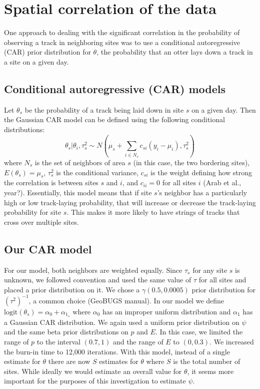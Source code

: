 \documentclass[12pt]{article}
\begin{document}
\section{Spatial correlation of the data}
One approach to dealing with the significant correlation in the probability of
observing a track in neighboring sites was to use a conditional autoregressive
(CAR) prior distribution for $\theta$, the probability that an otter lays down a
track in a site on a given day.

    \subsection{Conditional autoregressive (CAR) models}
    Let $\theta_s$ be the probability of a track being laid down in site $s$ on
    a given day. Then the Gaussian CAR model can be defined using the following
    conditional distributions:
    \begin{equation}
        \theta_s|\theta_i,\tau_s^2 \sim N(\mu_s+\sum_{i\in N_s}
        c_{si}(y_i-\mu_i),\tau_s^2)
    \end{equation}
    where $N_s$ is the set of neighbors of area $s$ (in this case, the two
    bordering sites), $E(\theta_s)=\mu_s$, $\tau_s^2$ is the conditional
    variance, $c_{si}$ is the weight defining how strong the correlation is
    between sites $s$ and $i$, and $c_{ii}=0$ for all sites $i$ (Arab et al.,
    year?). Essentially, this model means that if site $s$'s neighbor has a
    particularly high or low track-laying probability, that will increase or
    decrease the track-laying probability for site $s$. This makes it more
    likely to have strings of tracks that cross over multiple sites.

    \subsection{Our CAR model}
    \label{car model}
    For our model, both neighbors are weighted equally. Since $\tau_s$ for any
    site $s$ is unknown, we followed convention and used the same value of
    $\tau$ for all sites and placed a prior distribution on it. We chose a
    $\gamma(0.5,0.0005)$ prior distribution for $(\tau^2)^{-1}$, a common choice
    (GeoBUGS manual). In our model we define $\text{logit}(\theta_s)=\alpha_0+
    \alpha_{1_s}$ where $\alpha_0$ has an improper uniform distribution and
    $\alpha_1$ has a Gaussian CAR distribution. We again used a uniform prior
    distribution on $\psi$ and the same beta prior distributions on $p$ and $E$.
    In this case, we limited the range of $p$ to the interval $(0.7,1)$ and the
    range of $E$ to $(0,0.3)$. We increased the burn-in time to 12,000
    iterations. With this model, instead of a single estimate for $\theta$ there
    are now $S$ estimates for $\theta$ where $S$ is the total number of sites.
    While ideally we would estimate an overall value for $\theta$, it seems more
    important for the purposes of this investigation to estimate $\psi$.
\end{document}
